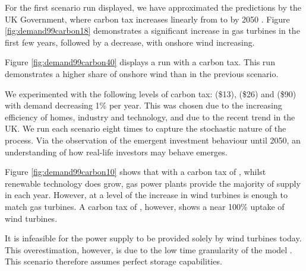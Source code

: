 

For the first scenario run displayed, we have approximated the predictions by the UK Government, where carbon tax increases linearly from  to  by 2050 \cite{Department2016}. Figure \ref{fig:demand99carbon18} demonstrates a significant increase in gas turbines in the first few years, followed by a decrease, with onshore wind increasing.

Figure \ref{fig:demand99carbon40} displays a run with a  carbon tax. This run demonstrates a higher share of onshore wind than in the previous scenario. 

We experimented with the following levels of carbon tax:  (\$13),  (\$26) and  (\$90) with demand decreasing 1\% per year. This was chosen due to the increasing efficiency of homes, industry and technology, and due to the recent trend in the UK. We run each scenario eight times to capture the stochastic nature of the process. Via the observation of the emergent investment behaviour until 2050, an understanding of how real-life investors may behave emerges.


Figure \ref{fig:demand99carbon10} shows that with a carbon tax of , whilst renewable technology does grow, gas power plants provide the majority of supply in each year. However, at a level of  the increase in wind turbines is enough to match gas turbines. A carbon tax of , however, shows a near 100\% uptake of wind turbines.

It is infeasible for the power supply to be provided solely by wind turbines today. This overestimation, however, is due to the low time granularity of the model \cite{Collins2017}. This scenario therefore assumes perfect storage capabilities.



